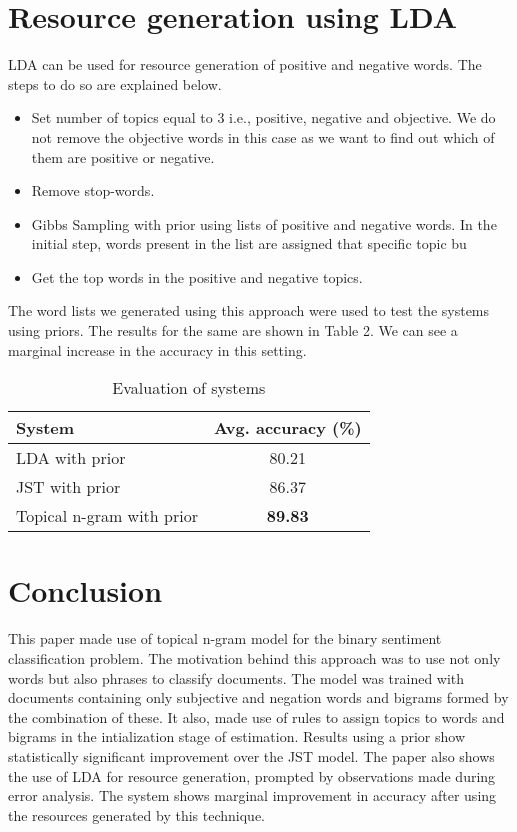 \documentclass[11pt]{article}
\begin{document}
\section{Resource generation using LDA}\label{resource}

LDA can be used for resource generation of positive and negative words. The steps to do so are explained below.

\begin{itemize}
 \itemsep0em
 \item Set number of topics equal to 3 i.e., positive, negative and objective. We do not remove the objective
 words in this case as we want to find out which of them are positive or negative.
 \item Remove stop-words.
 \item Gibbs Sampling with prior using lists of positive and negative words. In the initial step, words present 
 in the list are assigned that specific topic bu
 \item Get the top words in the positive and negative topics.
\end{itemize}

The word lists we generated using this approach were used to test the systems using priors. The results for the same
are shown in Table 2. We can see a marginal increase in the accuracy in this setting.

\begin{table}[h]
\begin{center}
\begin{tabular}{|l|c|}
\hline \bf System & \bf Avg. accuracy (\%)\\ \hline
LDA with prior & 80.21\\
JST with prior & 86.37\\
Topical n-gram with prior & \textbf{89.83}\\
\hline
\end{tabular}
\end{center}
\caption{\label{result-table} Evaluation of systems}
\end{table}

\section{Conclusion}\label{conclusion}

This paper made use of topical n-gram model for the binary sentiment classification problem. The motivation behind this
approach was to use not only words but also phrases to classify documents. The model was trained with documents containing
only subjective and negation words and bigrams formed by the combination of these. It also, made use of rules to 
assign topics to words and bigrams in the intialization stage of estimation. Results using a prior show statistically 
significant improvement over the JST model. The paper also shows the use of LDA for resource generation, prompted by 
observations made during error analysis. The system shows marginal improvement in accuracy after using the resources
generated by this technique.
\end{document}
